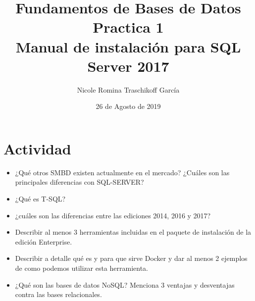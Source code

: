 \documentclass[letterpaper,12pt]{article}
\begin{document}
			\title{Fundamentos de Bases de Datos \\
				Practica 1 \\
				Manual de instalación para SQL Server 2017}
		\author{Nicole Romina Traschikoff García}
		\date{26 de Agosto de 2019}
		\maketitle

		\section{Actividad}
          \begin{itemize}
          	\item ¿Qué otros SMBD existen actualmente en el mercado? ¿Cuáles son las principales diferencias con SQL-SERVER?
						\item ¿Qué es T-SQL?
						\item ¿cuáles son las diferencias entre las ediciones 2014, 2016 y 2017?
						\item Describir al menos 3 herramientas incluidas en el paquete de instalación de la edición Enterprise.
						\item Describir a detalle qué es y para que sirve Docker y dar al menos 2 ejemplos de como podemos utilizar esta herramienta.
						\item ¿Qué son las bases de datos NoSQL? Menciona 3 ventajas y desventajas contra las bases relacionales.
          \end{itemize}
\end{document}
